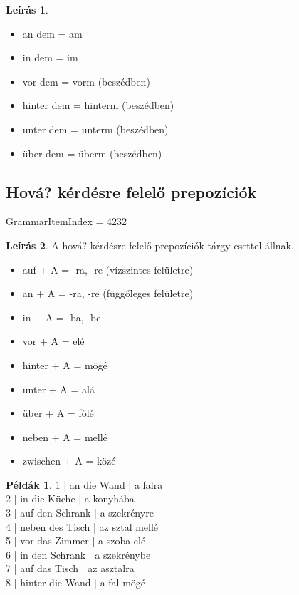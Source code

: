 \documentclass{article}
\theoremstyle{definition}
\newtheorem*{exmp}{Példák}
\newtheorem*{desc}{Leírás}
\begin{document}
\begin{desc}
\begin{itemize}
\item an dem = am
\item in dem = im
\item vor dem = vorm (beszédben)
\item hinter dem = hinterm (beszédben)
\item unter dem = unterm (beszédben)
\item über dem = überm (beszédben)
\end{itemize}
\end{desc}

\subsection{Hová? kérdésre felelő prepozíciók}

GrammarItemIndex = 4232

\begin{desc}
A hová? kérdésre felelő prepozíciók tárgy esettel állnak.

\begin{itemize}
\item auf + A = -ra, -re (vízszintes felületre)
\item an + A = -ra, -re (függőleges felületre)
\item in + A = -ba, -be
\item vor + A = elé
\item hinter + A = mögé
\item unter + A = alá
\item über + A = fölé
\item neben + A = mellé
\item zwischen + A = közé
\end{itemize}
\end{desc}

\begin{exmp}
1 | an die Wand | a falra\\
2 | in die Küche | a konyhába\\
3 | auf den Schrank | a szekrényre\\
4 | neben des Tisch | az sztal mellé\\
5 | vor das Zimmer | a szoba elé\\
6 | in den Schrank | a szekrénybe\\
7 | auf das Tisch | az asztalra\\
8 | hinter die Wand | a fal mögé\\
\end{exmp}
\end{document}
